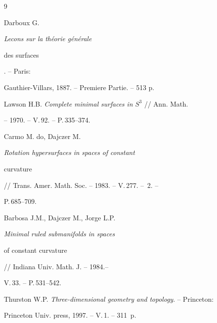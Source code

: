 \begin{thebibliography}{9}







Darboux G. {\em Lecons sur la th\'eorie g\'en\'erale


des surfaces}. -- Paris: 


Gauthier-Villars, 1887. -- Premiere Partie. -- 513 p. 




Lawson H.B. {\em Complete minimal surfaces in $S^3$} // Ann. Math.


-- 1970. -- V.\,92. -- P.\,335--374.




Carmo M. do, Dajczer M. {\em Rotation hypersurfaces in spaces of constant 


curvature} // Trans. Amer. Math. Soc. -- 1983. -- V.\,277. -- \No\,2. --


P.\,685--709.




Barbosa J.M., Dajczer M., Jorge L.P. {\em Minimal ruled submanifolds in spaces 


of constant curvature} // Indiana Univ. Math. J. -- 1984.-- 


V.\,33. -- P.\,531--542.




Thurston W.P. {\em Three-dimensional geometry and topology}. -- Princeton: 


Princeton Univ. press, 1997. -- V.\,1. -- 311~p.








\end{thebibliography}





\vskip 2cm












\label{end}





